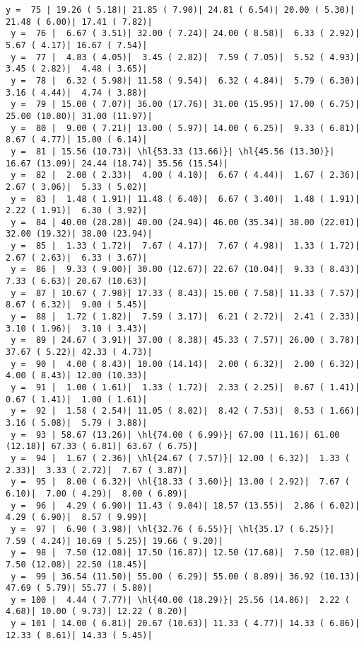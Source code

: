 \documentclass[10pt]{article}
\newcommand{\hl}[1]{\textbf{\textcolor{red}{#1}}}
\begin{document}
\begin{Verbatim}[fontsize=\small, commandchars=\\\{\}]
 y =  75 | 19.26 ( 5.18)| 21.85 ( 7.90)| 24.81 ( 6.54)| 20.00 ( 5.30)| 21.48 ( 6.00)| 17.41 ( 7.82)|
 y =  76 |  6.67 ( 3.51)| 32.00 ( 7.24)| 24.00 ( 8.58)|  6.33 ( 2.92)|  5.67 ( 4.17)| 16.67 ( 7.54)|
 y =  77 |  4.83 ( 4.05)|  3.45 ( 2.82)|  7.59 ( 7.05)|  5.52 ( 4.93)|  3.45 ( 2.82)|  4.48 ( 3.65)|
 y =  78 |  6.32 ( 5.98)| 11.58 ( 9.54)|  6.32 ( 4.84)|  5.79 ( 6.30)|  3.16 ( 4.44)|  4.74 ( 3.88)|
 y =  79 | 15.00 ( 7.07)| 36.00 (17.76)| 31.00 (15.95)| 17.00 ( 6.75)| 25.00 (10.80)| 31.00 (11.97)|
 y =  80 |  9.00 ( 7.21)| 13.00 ( 5.97)| 14.00 ( 6.25)|  9.33 ( 6.81)|  8.67 ( 4.77)| 15.00 ( 6.14)|
 y =  81 | 15.56 (10.73)| \hl{53.33 (13.66)}| \hl{45.56 (13.30)}| 16.67 (13.09)| 24.44 (18.74)| 35.56 (15.54)|
 y =  82 |  2.00 ( 2.33)|  4.00 ( 4.10)|  6.67 ( 4.44)|  1.67 ( 2.36)|  2.67 ( 3.06)|  5.33 ( 5.02)|
 y =  83 |  1.48 ( 1.91)| 11.48 ( 6.40)|  6.67 ( 3.40)|  1.48 ( 1.91)|  2.22 ( 1.91)|  6.30 ( 3.92)|
 y =  84 | 40.00 (28.28)| 40.00 (24.94)| 46.00 (35.34)| 38.00 (22.01)| 32.00 (19.32)| 38.00 (23.94)|
 y =  85 |  1.33 ( 1.72)|  7.67 ( 4.17)|  7.67 ( 4.98)|  1.33 ( 1.72)|  2.67 ( 2.63)|  6.33 ( 3.67)|
 y =  86 |  9.33 ( 9.00)| 30.00 (12.67)| 22.67 (10.04)|  9.33 ( 8.43)|  7.33 ( 6.63)| 20.67 (10.63)|
 y =  87 | 10.67 ( 7.98)| 17.33 ( 8.43)| 15.00 ( 7.58)| 11.33 ( 7.57)|  8.67 ( 6.32)|  9.00 ( 5.45)|
 y =  88 |  1.72 ( 1.82)|  7.59 ( 3.17)|  6.21 ( 2.72)|  2.41 ( 2.33)|  3.10 ( 1.96)|  3.10 ( 3.43)|
 y =  89 | 24.67 ( 3.91)| 37.00 ( 8.38)| 45.33 ( 7.57)| 26.00 ( 3.78)| 37.67 ( 5.22)| 42.33 ( 4.73)|
 y =  90 |  4.00 ( 8.43)| 10.00 (14.14)|  2.00 ( 6.32)|  2.00 ( 6.32)|  4.00 ( 8.43)| 12.00 (10.33)|
 y =  91 |  1.00 ( 1.61)|  1.33 ( 1.72)|  2.33 ( 2.25)|  0.67 ( 1.41)|  0.67 ( 1.41)|  1.00 ( 1.61)|
 y =  92 |  1.58 ( 2.54)| 11.05 ( 8.02)|  8.42 ( 7.53)|  0.53 ( 1.66)|  3.16 ( 5.08)|  5.79 ( 3.88)|
 y =  93 | 58.67 (13.26)| \hl{74.00 ( 6.99)}| 67.00 (11.16)| 61.00 (12.18)| 67.33 ( 6.81)| 63.67 ( 6.75)|
 y =  94 |  1.67 ( 2.36)| \hl{24.67 ( 7.57)}| 12.00 ( 6.32)|  1.33 ( 2.33)|  3.33 ( 2.72)|  7.67 ( 3.87)|
 y =  95 |  8.00 ( 6.32)| \hl{18.33 ( 3.60)}| 13.00 ( 2.92)|  7.67 ( 6.10)|  7.00 ( 4.29)|  8.00 ( 6.89)|
 y =  96 |  4.29 ( 6.90)| 11.43 ( 9.04)| 18.57 (13.55)|  2.86 ( 6.02)|  4.29 ( 6.90)|  8.57 ( 9.99)|
 y =  97 |  6.90 ( 3.98)| \hl{32.76 ( 6.55)}| \hl{35.17 ( 6.25)}|  7.59 ( 4.24)| 10.69 ( 5.25)| 19.66 ( 9.20)|
 y =  98 |  7.50 (12.08)| 17.50 (16.87)| 12.50 (17.68)|  7.50 (12.08)|  7.50 (12.08)| 22.50 (18.45)|
 y =  99 | 36.54 (11.50)| 55.00 ( 6.29)| 55.00 ( 8.89)| 36.92 (10.13)| 47.69 ( 5.79)| 55.77 ( 5.80)|
 y = 100 |  4.44 ( 7.77)| \hl{40.00 (18.29)}| 25.56 (14.86)|  2.22 ( 4.68)| 10.00 ( 9.73)| 12.22 ( 8.20)|
 y = 101 | 14.00 ( 6.81)| 20.67 (10.63)| 11.33 ( 4.77)| 14.33 ( 6.86)| 12.33 ( 8.61)| 14.33 ( 5.45)|
\end{Verbatim}
\end{document}
